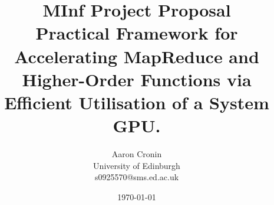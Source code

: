 \begin{titlepage}
  \title{{\small MInf Project Proposal}\\Practical Framework for Accelerating MapReduce and Higher-Order Functions via Efficient Utilisation of a System GPU.}   %
\author{Aaron Cronin\\University of Edinburgh\\ s0925570@sms.ed.ac.uk}         %

\date{\today}    %
\end{titlepage}

